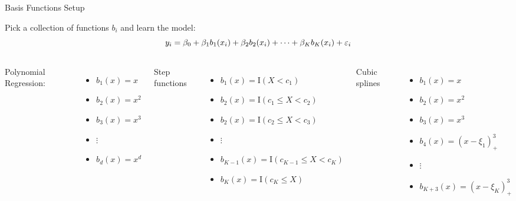 \documentclass[aspectratio=169,usenames,dvipsnames]{beamer}
\newcommand{\InstructorList}[1]{
\begin{itemize}
	\color{orange}
	#1
\end{itemize}
}
\begin{document}
\begin{frame}[t]{Basis Functions Setup}

Pick a collection of functions $b_i$ and learn the model:
\begin{equation*}
	y_i = \beta_0 + \beta_1b_1(x_i) + \beta_2 b_2(x_i) + \cdots + \beta_K b_K(x_i) + \varepsilon_i
\end{equation*}

\begin{columns}
\centering
Polynomial Regression:
\footnotesize
	\begin{itemize}
		\item $b_1(x) = x$
		\item $b_2(x) = x^2$
		\item $b_3(x) = x^3$
		\item $\vdots$
		\item $b_d(x) = x^d$
	\end{itemize}


\centering
Step functions
\footnotesize
	\begin{itemize}
		\item $b_1(x) = \mathrm{I}(X<c_1)$
		\item $b_2(x) = \mathrm{I}(c_1 \leq X < c_2)$
		\item $b_2(x) = \mathrm{I}(c_2 \leq X < c_3)$
		\item $\vdots $
		\item $b_{K-1}(x) = \mathrm{I}(c_{K-1} \leq X < c_K)$
		\item $b_K(x) = \mathrm{I}(c_K \leq X)$

	\end{itemize}



\centering
Cubic splines
\footnotesize
	\begin{itemize}
		\item $b_1(x) = x$
		\item $b_2(x) = x^2$
		\item $b_3(x) = x^3$
		\item $b_4(x) = (x-\xi_1)^3_+$
		\item $\vdots$
		\item $b_{K+3}(x) = (x-\xi_K)^3_+$


	\end{itemize}

%



\end{columns}
\end{frame}
\end{document}
